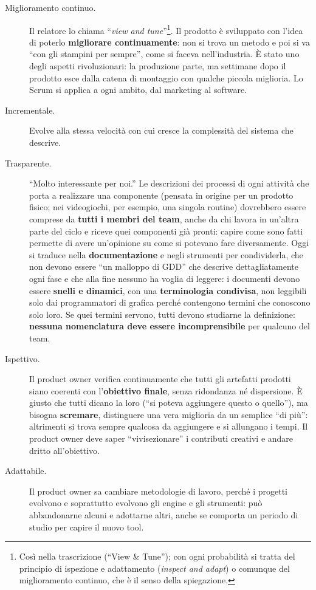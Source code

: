 \begin{description}
  \item[Miglioramento continuo.] Il relatore lo chiama ``\emph{view and
        tune}''\footnote{Così nella trascrizione (``View \& Tune''); con ogni
        probabilità si tratta del principio di ispezione e adattamento
        (\emph{inspect and adapt}) o comunque del miglioramento continuo, che è
        il senso della spiegazione.}. Il prodotto è sviluppato con l'idea di
        poterlo \textbf{migliorare continuamente}: non si trova un metodo e poi
        si va ``con gli stampini per sempre'', come si faceva nell'industria. È
        stato uno degli aspetti rivoluzionari: la produzione parte, ma settimane
        dopo il prodotto esce dalla catena di montaggio con qualche piccola
        miglioria. Lo Scrum si applica a ogni ambito, dal marketing al software.
  \item[Incrementale.] Evolve alla stessa velocità con cui cresce la complessità
        del sistema che descrive.
  \item[Trasparente.] ``Molto interessante per noi.'' Le descrizioni dei
        processi di ogni attività che porta a realizzare una componente
        (pensata in origine per un prodotto fisico; nei videogiochi, per esempio,
        una singola routine) dovrebbero essere comprese da \textbf{tutti i membri
        del team}, anche da chi lavora in un'altra parte del ciclo e riceve quei
        componenti già pronti: capire come sono fatti permette di avere
        un'opinione su come si potevano fare diversamente. Oggi si traduce nella
        \textbf{documentazione} e negli strumenti per condividerla, che non
        devono essere ``un malloppo di GDD'' che descrive dettagliatamente ogni
        fase e che alla fine nessuno ha voglia di leggere: i documenti devono
        essere \textbf{snelli e dinamici}, con una \textbf{terminologia
        condivisa}, non leggibili solo dai programmatori di grafica perché
        contengono termini che conoscono solo loro. Se quei termini servono,
        tutti devono studiarne la definizione: \textbf{nessuna nomenclatura deve
        essere incomprensibile} per qualcuno del team.
  \item[Ispettivo.] Il product owner verifica continuamente che tutti gli
        artefatti prodotti siano coerenti con l'\textbf{obiettivo finale}, senza
        ridondanza né dispersione. È giusto che tutti dicano la loro (``si poteva
        aggiungere questo o quello''), ma bisogna \textbf{scremare}, distinguere
        una vera miglioria da un semplice ``di più'': altrimenti si trova sempre
        qualcosa da aggiungere e si allungano i tempi. Il product owner deve
        saper ``vivisezionare'' i contributi creativi e andare dritto
        all'obiettivo.
  \item[Adattabile.] Il product owner sa cambiare metodologie di lavoro, perché i
        progetti evolvono e soprattutto evolvono gli engine e gli strumenti:
        può abbandonarne alcuni e adottarne altri, anche se comporta un periodo
        di studio per capire il nuovo tool.
\end{description}

